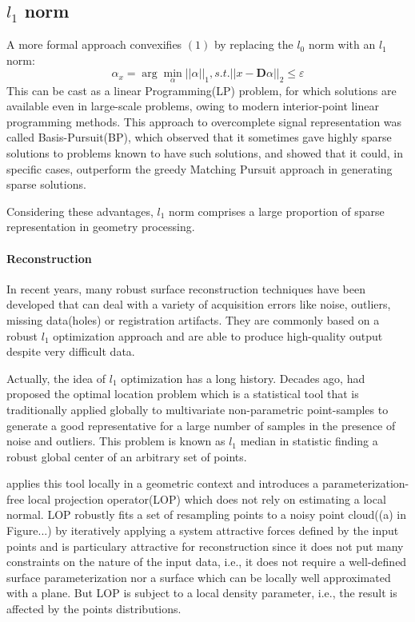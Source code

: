 \label{sec:L1}

\subsection{$l_1$ norm}

A more formal approach convexifies $(1)$ by replacing the $l_0$ norm with an $l_1$ norm:
\begin{equation}
 \label{eq:L1 modeling}
 \alpha_{x} = \arg\min_{\alpha}||\alpha||_1, s.t. ||x-\mathbf{D}\alpha||_2 \le \varepsilon
\end{equation}
This can be cast as a linear Programming(LP) problem, for which solutions are available even in large-scale problems, owing to modern interior-point linear programming methods. This approach to overcomplete signal representation was called Basis-Pursuit(BP)\cite{chen1998atomic}, which observed that it sometimes gave highly sparse solutions to problems known to have such solutions, and showed that it could, in specific cases, outperform the greedy Matching Pursuit approach in generating sparse solutions.

Considering these advantages, $l_1$ norm comprises a large proportion of sparse representation in geometry processing.

\paragraph{Reconstruction}In recent years, many robust surface reconstruction techniques have been developed that can deal with a variety of acquisition errors like noise, outliers, missing data(holes) or registration artifacts. They are commonly based on a robust $l_1$ optimization approach and are able to produce high-quality output despite very difficult data.

Actually, the idea of $l_1$ optimization has a long history. Decades ago, \cite{weber1909theory} had proposed the optimal location problem which is a statistical tool that is traditionally applied globally to multivariate non-parametric point-samples to generate a good representative for a large number of samples in the presence of noise and outliers. This problem is known as $l_1$ median\cite{brown1983statistical,small1990survey} in statistic finding a robust global center of an arbitrary set of points.

\cite{lipman2007parameterization} applies this tool locally in a geometric context and introduces a parameterization-free local projection operator(LOP) which does not rely on estimating a local normal. LOP robustly fits a set of resampling points to a noisy point cloud((a) in Figure...) by iteratively applying a system attractive forces defined by the input points and is particulary attractive for reconstruction since it does not put many constraints on the nature of the input data, i.e., it does not require a well-defined surface parameterization nor a surface which can be locally well approximated with a plane. But LOP is subject to a local density parameter, i.e., the result is affected by the points distributions.

